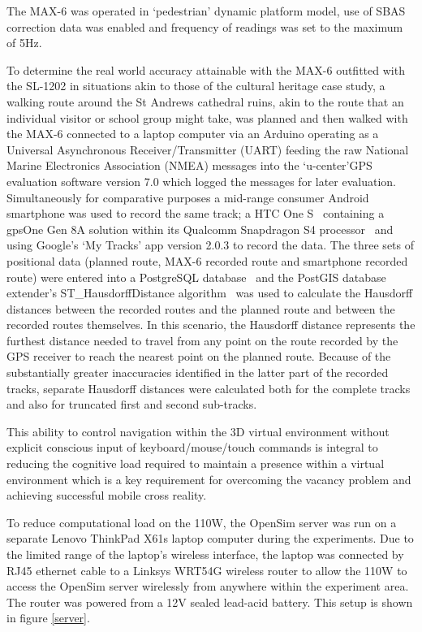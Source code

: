 The MAX-6 was operated in `pedestrian' dynamic platform model, use of SBAS correction data was enabled and frequency of readings was set to the maximum of 5Hz.

To determine the real world accuracy attainable with the MAX-6 outfitted with the SL-1202 in situations akin to those of the cultural heritage case study, a walking route around the St Andrews cathedral ruins, akin to the route that an individual visitor or school group might take, was planned and then walked with the MAX-6 connected to a laptop computer via an Arduino operating as a Universal Asynchronous Receiver/Transmitter (UART) feeding the raw National Marine Electronics Association (NMEA) messages into the `u-center'GPS evaluation software version 7.0 which logged the messages for later evaluation. Simultaneously for comparative purposes a mid-range consumer Android smartphone was used to record the same track; a HTC One S~\cite{HTCCorporation2013} containing a gpsOne Gen 8A solution within its Qualcomm Snapdragon S4 processor~\cite{QualcommIncorporated2013} and using Google's `My Tracks' app version 2.0.3 to record the data. The three sets of positional data (planned route, MAX-6 recorded route and smartphone recorded route) were entered into a PostgreSQL database~\cite{Daviesc,Daviesb} and the PostGIS database extender's ST\_HausdorffDistance algorithm~\cite{PostGIS} was used to calculate the Hausdorff distances between the recorded routes and the planned route and between the recorded routes themselves. In this scenario, the Hausdorff distance represents the furthest distance needed to travel from any point on the route recorded by the GPS receiver to reach the nearest point on the planned route. Because of the substantially greater inaccuracies identified in the latter part of the recorded tracks, separate Hausdorff distances were calculated both for the complete tracks and also for truncated first and second sub-tracks.

This ability to control navigation within the 3D virtual environment without explicit conscious input of keyboard/mouse/touch commands is integral to reducing the cognitive load required to maintain a presence within a virtual environment which is a key requirement for overcoming the vacancy problem and achieving successful mobile cross reality.



To reduce computational load on the 110W, the OpenSim server was run on a separate Lenovo ThinkPad X61s laptop computer during the experiments. Due to the limited range of the laptop's wireless interface, the laptop was connected by RJ45 ethernet cable to a Linksys WRT54G wireless router to allow the 110W to access the OpenSim server wirelessly from anywhere within the experiment area. The router was powered from a 12V sealed lead-acid battery. This setup is shown in figure \ref{server}.





